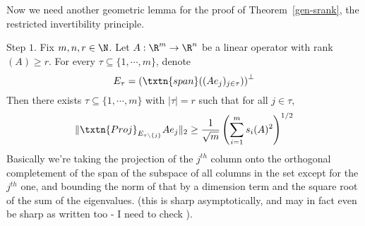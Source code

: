 Now we need another geometric lemma for the proof of Theorem~\ref{gen-srank}, the restricted invertibility principle. 

\begin{lem} Step $1$. 
Fix $m, n, r \in \N$. Let $A: \R^m \to \R^n$ be a linear operator with rank$(A) \geq r$. For every $\tau \subseteq \{1, \cdots, m\}$, denote
\[
E_{\tau} = \left(\txtn{span}((Ae_j)_{j \in \tau})\right)^{\perp}
\] 
Then there exists $\tau \subseteq \{1, \cdots, m\}$ with $|\tau| = r$ such that for all $j \in \tau$, 
\[
\|\txtn{Proj}_{E_{\tau \setminus \{j\}}} Ae_j\|_2 \geq \frac{1}{\sqrt{m}}\left(\sum_{i = 1}^m s_i(A)^2\right)^{1/2}
\]
Basically we're taking the projection of the $j^{th}$ column onto the orthogonal completement of the span of the subspace of all columns in the set except for the $j^{th}$ one, and bounding the norm of that by a dimension term and the square root of the sum of the eigenvalues. 
(this is sharp asymptotically, and may in fact even be sharp as written too - I need to check ). 
\end{lem}

